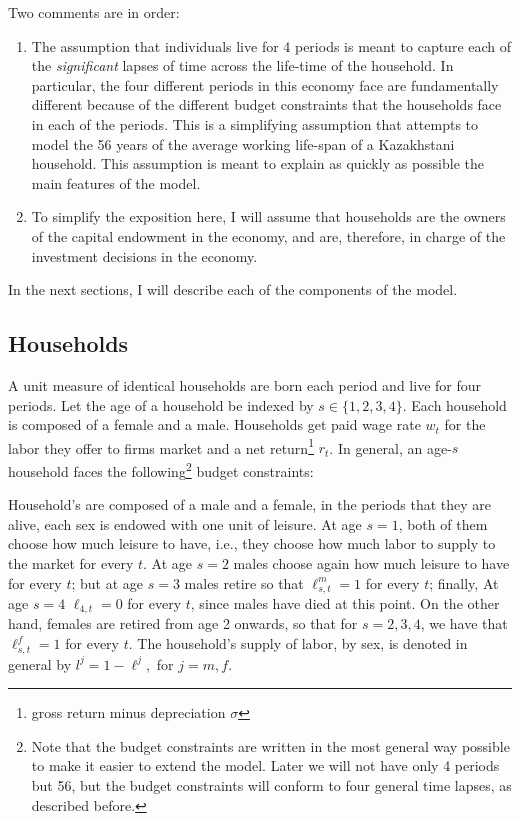 \documentclass[ProjectUYA]{subfiles}
\begin{document}
 Two comments are in order:
 	\begin{enumerate}
 		\item  The assumption that individuals live for 4 periods is meant to capture each of the \emph{significant} lapses of time across the life-time of the household. In particular, the four different periods in this economy face are fundamentally different because of the different budget constraints that the households face in each of the periods. This is a simplifying assumption that attempts to model the 56 years of the average working life-span of a Kazakhstani household. This assumption is meant to explain as quickly as possible the main features of the model. 
 		\item To simplify the exposition here, I will assume that households are the owners of the capital endowment in the economy, and are, therefore, in charge of the investment decisions in the economy. 
 	\end{enumerate}

 In the next sections, I will describe each of the components of the model.

 \subsection{Households}

 A unit measure of identical households are born each period and live for four periods. Let the age of a household be indexed by $s\in\{1,2,3,4\}.$ Each household is composed of a female and a male. Households get paid wage rate $w_t$ for the labor they offer to firms market and a net return\footnote{gross return minus depreciation $\sigma$} $r_t$. In general, an age-$s$ household
 faces the following\footnote{Note that the budget constraints are written in the most general way possible to make it easier to extend the model. Later we will not have only 4 periods but 56, but the budget constraints will conform to four general time lapses, as described before. } budget constraints:
 


Household's are composed of a male and a female, in the periods that they are alive, each sex is endowed with one unit of leisure. At age $s=1$, both of them choose how much leisure to have, i.e., they choose how much labor to supply to the market for every $t$. At age $s=2$ males choose again how much leisure to have for every $t$; but at age $s=3$ males retire so that  $\ell_{s,t}^m=1$ for every $t$; finally,  At age $s=4$ $\ell_{4,t}=0$ for every $t$, since males have died at this point. On the other hand, females are retired from age 2 onwards, so that for $s=2,3,4$, we have that $\ell_{s,t}^f=1$ for every $t.$ The household's supply of labor, by sex, is denoted in general by $l^j=1-\ell^j,$ for $j=m,f.$
\end{document}
